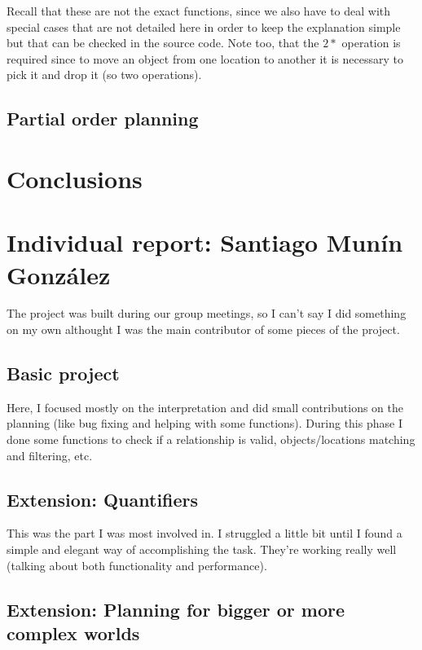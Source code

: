 \documentclass[11pt]{article}
\begin{document}
        Recall that these are not the exact functions, since we also have to deal with 
        special cases that are not detailed here in order to keep the explanation simple 
        but that can be checked in the source code. Note too, that the $2 *$ operation is
        required since to move an object from one location to another it is necessary to 
        pick it and drop it (so two operations).

	\subsection{Partial order planning}

	\section{Conclusions}
\newpage
\appendix
\section{Individual report: Santiago Munín González}
The project was built during our group meetings, so I can't say I did something on my own althought I 
was the main contributor of some pieces of the project.

\subsection{Basic project}

Here, I focused mostly on the interpretation and did small contributions on the planning (like bug fixing and 
helping with some functions). During this phase I done some functions to check if a relationship is valid, 
objects/locations matching and filtering, etc.

\subsection{Extension: Quantifiers}

This was the part I was most involved in. I struggled a little 
bit until I found a simple and elegant way of accomplishing the task. They're working really well (talking about both functionality and performance).

\subsection{Extension: Planning for bigger or more complex worlds}
\end{document}
